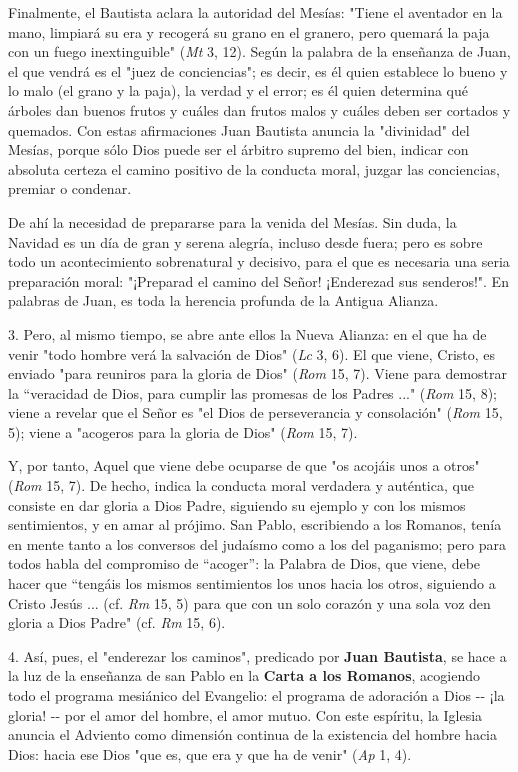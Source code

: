Finalmente, el Bautista aclara la autoridad del Mesías: "Tiene el
aventador en la mano, limpiará su era y recogerá su grano en el granero,
pero quemará la paja con un fuego inextinguible" (\emph{Mt} 3, 12).
Según la palabra de la enseñanza de Juan, el que vendrá es el "juez de
conciencias"; es decir, es él quien establece lo bueno y lo malo (el
grano y la paja), la verdad y el error; es él quien determina qué
árboles dan buenos frutos y cuáles dan frutos malos y cuáles deben ser
cortados y quemados. Con estas afirmaciones Juan Bautista anuncia la
"divinidad" del Mesías, porque sólo Dios puede ser el árbitro supremo
del bien, indicar con absoluta certeza el camino positivo de la conducta
moral, juzgar las conciencias, premiar o condenar.

De ahí la necesidad de prepararse para la venida del Mesías. Sin duda,
la Navidad es un día de gran y serena alegría, incluso desde fuera; pero
es sobre todo un acontecimiento sobrenatural y decisivo, para el que es
necesaria una seria preparación moral: "¡Preparad el camino del Señor!
¡Enderezad sus senderos!". En palabras de Juan, es toda la herencia
profunda de la Antigua Alianza.

3. Pero, al mismo tiempo, se abre ante ellos la Nueva Alianza: en el que
ha de venir "todo hombre verá la salvación de Dios" (\emph{Lc} 3, 6). El
que viene, Cristo, es enviado "para reuniros para la gloria de Dios"
(\emph{Rom} 15, 7). Viene para demostrar la ``veracidad de Dios, para
cumplir las promesas de los Padres ..." (\emph{Rom} 15, 8); viene a
revelar que el Señor es "el Dios de perseverancia y consolación"
(\emph{Rom} 15, 5); viene a "acogeros para la gloria de Dios"
(\emph{Rom} 15, 7).

Y, por tanto, Aquel que viene debe ocuparse de que "os acojáis unos a
otros" (\emph{Rom} 15, 7). De hecho, indica la conducta moral verdadera
y auténtica, que consiste en dar gloria a Dios Padre, siguiendo su
ejemplo y con los mismos sentimientos, y en amar al prójimo. San Pablo,
escribiendo a los Romanos, tenía en mente tanto a los conversos del
judaísmo como a los del paganismo; pero para todos habla del compromiso
de ``acoger'': la Palabra de Dios, que viene, debe hacer que ``tengáis
los mismos sentimientos los unos hacia los otros, siguiendo a Cristo
Jesús ... (cf. \emph{Rm} 15, 5) para que con un solo corazón y una sola
voz den gloria a Dios Padre" (cf. \emph{Rm} 15, 6).

4. Así, pues, el "enderezar los caminos", predicado por \textbf{Juan
	Bautista}, se hace a la luz de la enseñanza de san Pablo en la
\textbf{Carta a los Romanos}, acogiendo todo el programa mesiánico del
Evangelio: el programa de adoración a Dios -\/- ¡la gloria! -\/- por el
amor del hombre, el amor mutuo. Con este espíritu, la Iglesia anuncia el
Adviento como dimensión continua de la existencia del hombre hacia Dios:
hacia ese Dios "que es, que era y que ha de venir" (\emph{Ap} 1, 4).

